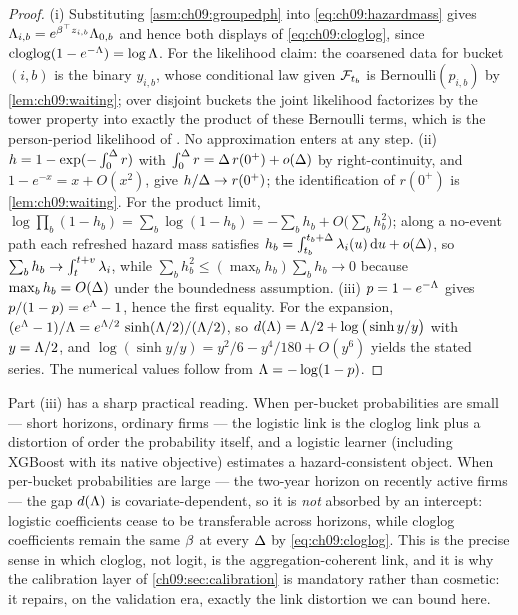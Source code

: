 \begin{proof}
(i) Substituting \cref{asm:ch09:groupedph} into
\cref{eq:ch09:hazardmass} gives $\Lambda_{i,b} = e^{\beta^{\top}z_{i,b}}
\Lambda_{0,b}$ and hence both displays of \cref{eq:ch09:cloglog}, since
$\operatorname{cloglog}(1 - e^{-\Lambda}) = \log \Lambda$. For the likelihood
claim: the coarsened data for bucket $(i,b)$ is the binary $y_{i,b}$,
whose conditional law given $\mathcal{F}_{t_b}$ is Bernoulli$(p_{i,b})$ by
\cref{lem:ch09:waiting}; over disjoint buckets the joint likelihood
factorizes by the tower property into exactly the product of these
Bernoulli terms, which is the person-period likelihood of
\citet{allison1982}. No approximation enters at any step.
(ii) $h = 1 - \exp(-\int_0^{\Delta} r)$ with $\int_0^{\Delta} r =
\Delta\, r(0^+) + o(\Delta)$ by right-continuity, and
$1 - e^{-x} = x + O(x^2)$, give $h/\Delta \to r(0^+)$; the
identification of $r(0^+)$ is \cref{lem:ch09:waiting}. For the product
limit, $\log \prod_b (1-h_b) = \sum_b \log(1-h_b) = -\sum_b h_b +
O\big(\sum_b h_b^2\big)$; along a no-event path each refreshed hazard
mass satisfies $h_b = \int_{t_b}^{t_b+\Delta} \lambda_i(u)\,\mathrm{d} u +
o(\Delta)$, so $\sum_b h_b \to \int_t^{t+v} \lambda_i$, while
$\sum_b h_b^2 \le (\max_b h_b) \sum_b h_b \to 0$ because
$\max_b h_b = O(\Delta)$ under the boundedness assumption.
(iii) $p = 1 - e^{-\Lambda}$ gives $p/(1-p) = e^{\Lambda}-1$, hence the first
equality. For the expansion, $(e^{\Lambda}-1)/\Lambda = e^{\Lambda/2}\,
\sinh(\Lambda/2)/(\Lambda/2)$, so $d(\Lambda) = \Lambda/2 + \log\big(\sinh y / y\big)$
with $y = \Lambda/2$, and $\log(\sinh y/y) = y^2/6 - y^4/180 + O(y^6)$
yields the stated series. The numerical values follow from
$\Lambda = -\log(1-p)$.
\end{proof}

Part (iii) has a sharp practical reading. When per-bucket probabilities
are small --- short horizons, ordinary firms --- the logistic link is the
cloglog link plus a distortion of order the probability itself, and a
logistic learner (including XGBoost with its native
 objective) estimates a hazard-consistent object.
When per-bucket probabilities are large --- the two-year horizon on
recently active firms --- the gap $d(\Lambda)$ is covariate-dependent, so it
is \emph{not} absorbed by an intercept: logistic coefficients cease to be
transferable across horizons, while cloglog coefficients remain the same
$\beta$ at every $\Delta$ by \cref{eq:ch09:cloglog}. This is the
precise sense in which cloglog, not logit, is the aggregation-coherent
link, and it is why the calibration layer of \cref{ch09:sec:calibration}
is mandatory rather than cosmetic: it repairs, on the validation era,
exactly the link distortion we can bound here.


